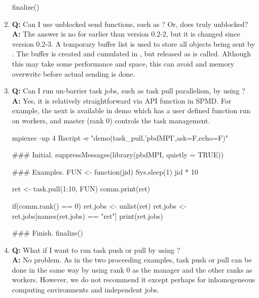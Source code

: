 \begin{enumerate}
\begin{Code}[title=SPMD R Script]
finalize()
\end{Code}


\item {\bf\color{blue} Q:}
      Can I use unblocked send functions, such as
      ? Or, does  truly unblocked? \\
      {\bf\color{blue} A:}
      The answer is no for  earlier than version 0.2-2, but
      it is changed since version 0.2-3. A temporary buffer list
       is used to store all objects being sent by
      . The buffer is created
      and cumulated in , but released as
       is called. Although this may take some performance
      and space, this can avoid  and memory overwrite before
      actual sending is done.


\item {\bf\color{blue} Q:}
      Can I run un-barrier task jobs, such as task pull parallelism,
      by using ? \\
      {\bf\color{blue} A:}
      Yes, it is relatively straightforward via  API function
       in SPMD. For example, the next is available
      in demo which has a user
      defined function  run on workers, and master (rank 0)
      controls the task management.
\begin{Command}
mpiexec -np 4 Rscript -e "demo(task_pull,'pbdMPI',ask=F,echo=F)"
\end{Command}
\begin{Code}[title=SPMD R Script (task\_pull)]
### Initial.
suppressMessages(library(pbdMPI, quietly = TRUE))

### Examples.
FUN <- function(jid){
  Sys.sleep(1)
  jid * 10
}

ret <- task.pull(1:10, FUN)
comm.print(ret)

if(comm.rank() == 0){
  ret.jobs <- unlist(ret)
  ret.jobs <- ret.jobs[names(ret.jobs) == "ret"]
  print(ret.jobs)
}

### Finish.
finalize()
\end{Code}


\item {\bf\color{blue} Q:}
      What if I want to run task push or pull by using ? \\
      {\bf\color{blue} A:}
      No problem. As in the two proceeding examples, task push or pull
      can be done in the same way by using rank 0 as the manager and
      the other ranks as workers. However, we do not recommend it
      except perhaps for inhomogeneous computing environments and
      independent jobs.


\end{enumerate}
